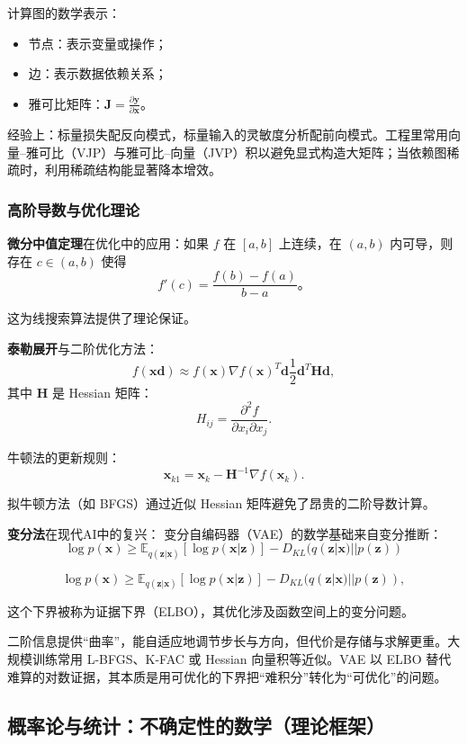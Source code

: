 \begin{itemize}
计算图的数学表示：
\begin{itemize}
  \item 节点：表示变量或操作；
  \item 边：表示数据依赖关系；
  \item 雅可比矩阵：$\mathbf{J} = \frac{\partial \mathbf{y}}{\partial \mathbf{x}}$。
\end{itemize}

经验上：标量损失配反向模式，标量输入的灵敏度分析配前向模式。工程里常用向量–雅可比（VJP）与雅可比–向量（JVP）积以避免显式构造大矩阵；当依赖图稀疏时，利用稀疏结构能显著降本增效。

\subsubsection{高阶导数与优化理论}

\textbf{微分中值定理}在优化中的应用：如果 $f$ 在 $[a,b]$ 上连续，在 $(a,b)$ 内可导，则存在 $c \in (a,b)$ 使得
$$
f'(c) = \frac{f(b) - f(a)}{b - a}。
$$

这为线搜索算法提供了理论保证。

\textbf{泰勒展开}与二阶优化方法：
$$
f(\mathbf{x}  \mathbf{d}) \approx f(\mathbf{x})  \nabla f(\mathbf{x})^T \mathbf{d}  \frac{1}{2}\mathbf{d}^T \mathbf{H} \mathbf{d},
$$
其中 $\mathbf{H}$ 是 Hessian 矩阵：
$$
H_{ij} = \frac{\partial^2 f}{\partial x_i \partial x_j}.
$$

牛顿法的更新规则：
$$
\mathbf{x}_{k1} = \mathbf{x}_k - \mathbf{H}^{-1} \nabla f(\mathbf{x}_k).
$$
 
拟牛顿方法（如 BFGS）通过近似 Hessian 矩阵避免了昂贵的二阶导数计算。

\textbf{变分法}在现代AI中的复兴：
变分自编码器（VAE）的数学基础来自变分推断：
$$\log p(\mathbf{x}) \geq \mathbb{E}_{q(\mathbf{z}|\mathbf{x})}[\log p(\mathbf{x}|\mathbf{z})] - D_{KL}(q(\mathbf{z}|\mathbf{x})||p(\mathbf{z}))$$

$$
\log p(\mathbf{x}) \geq \mathbb{E}_{q(\mathbf{z}|\mathbf{x})}[\log p(\mathbf{x}|\mathbf{z})] - D_{KL}(q(\mathbf{z}|\mathbf{x})||p(\mathbf{z})),
$$

这个下界被称为证据下界（ELBO），其优化涉及函数空间上的变分问题。

二阶信息提供“曲率”，能自适应地调节步长与方向，但代价是存储与求解更重。大规模训练常用 L-BFGS、K-FAC 或 Hessian 向量积等近似。VAE 以 ELBO 替代难算的对数证据，其本质是用可优化的下界把“难积分”转化为“可优化”的问题。

\subsection{概率论与统计：不确定性的数学（理论框架）}


\end{itemize}
